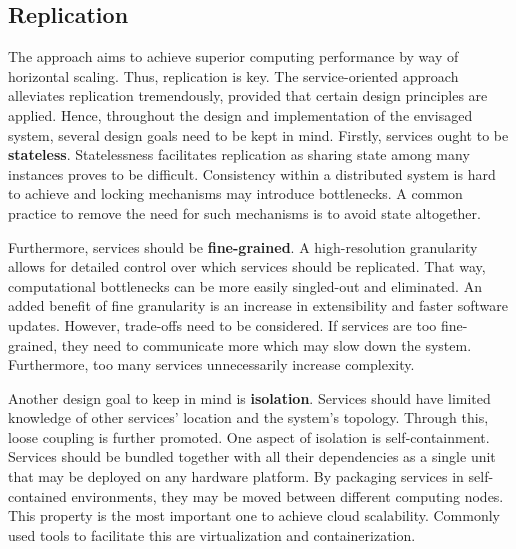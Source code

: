 \subsection{Replication}
The approach aims to achieve superior computing performance by way of horizontal scaling. Thus, replication is key.
The service-oriented approach alleviates replication tremendously, provided that certain design principles are applied. Hence, throughout the design and implementation of the envisaged system, several design goals need to be kept in mind. Firstly, services ought to be \textbf{stateless}. Statelessness facilitates replication as sharing state among many instances proves to be difficult. Consistency within a distributed system is hard to achieve and locking mechanisms may introduce bottlenecks. A common practice to remove the need for such mechanisms is to avoid state altogether.

Furthermore, services should be \textbf{fine-grained}. A high-resolution granularity allows for detailed control over which services should be replicated. That way, computational bottlenecks can be more easily singled-out and eliminated. An added benefit of fine granularity is an increase in extensibility and faster software updates. However, trade-offs need to be considered. If services are too fine-grained, they need to communicate more which may slow down the system. Furthermore, too many services unnecessarily increase complexity.

Another design goal to keep in mind is \textbf{isolation}. Services should have limited knowledge of other services' location and the system's topology. Through this, loose coupling is further promoted. One aspect of isolation is self-containment. Services should be bundled together with all their dependencies as a single unit that may be deployed on any hardware platform. By packaging services in self-contained environments, they may be moved between different computing nodes. This property is the most important one to achieve cloud scalability. Commonly used tools to facilitate this are virtualization and containerization.

